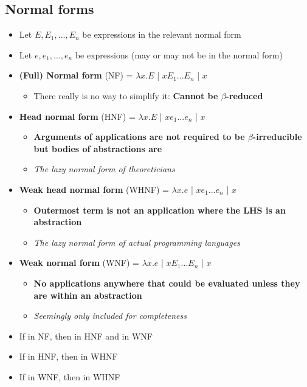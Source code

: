 \documentclass[20pt,a4paper,landscape]{extarticle}
\begin{document}
\begin{flushleft}
\subsection{Normal forms}
\begin{itemize}
\item Let $E, E_1, ..., E_n$ be expressions in the relevant normal form
\item Let $e, e_1, ..., e_n$ be expressions (may or may not be in the normal form)
\item \textbf{(Full) Normal form} (NF) = $\lambda x. E$ | $xE_1...E_n$ | $x$
    \begin{itemize}
    \item There really is no way to simplify it: \textbf{Cannot be $\beta$-reduced}
    \end{itemize}
\item \textbf{Head normal form} (HNF) = $\lambda x. E$ | $xe_1...e_n$ | $x$
    \begin{itemize}
    \item \textbf{Arguments of applications are not required to be $\beta$-irreducible but bodies of abstractions are}
    \item \textit{The lazy normal form of theoreticians}
    \end{itemize}
\clearpage
\item \textbf{Weak head normal form} (WHNF) = $\lambda x. e$ | $xe_1...e_n$ | $x$
    \begin{itemize}
    \item \textbf{Outermost term is not an application where the LHS is an abstraction}
    \item \textit{The lazy normal form of actual programming languages}
    \end{itemize}
\item \textbf{Weak normal form} (WNF) = $\lambda x. e$ | $xE_1...E_n$ | $x$
    \begin{itemize}
    \item \textbf{No applications anywhere that could be evaluated unless they are within an abstraction}
    \item \textit{Seemingly only included for completeness}
    \end{itemize}
\item If in NF, then in HNF and in WNF
\item If in HNF, then in WHNF
\item If in WNF, then in WHNF
\end{itemize}

\end{flushleft}
\end{document}
